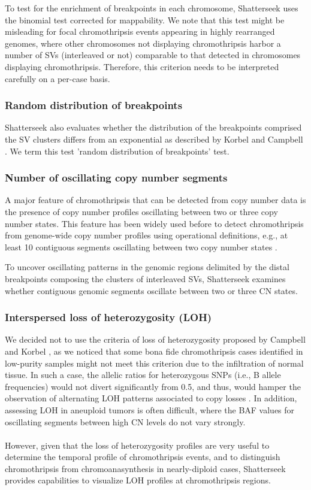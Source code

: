 \documentclass[twoside,a4wide,11pt]{article}\usepackage[]{graphicx}\usepackage[]{color}
\begin{document}
To test for the enrichment of breakpoints in each chromosome,
Shatterseek uses the binomial test corrected for mappability. 
We note that this test might be misleading for focal chromothripsis events
appearing in highly rearranged genomes, where
other chromosomes not displaying chromothripsis harbor a number of SVs (interleaved or not) comparable to that
detected in chromosomes displaying chromothripsis. 
Therefore, this criterion needs to be interpreted carefully on a per-case basis.

\subsubsection{Random distribution of breakpoints}
Shatterseek also evaluates whether the distribution of the breakpoints comprised the SV clusters
differs from an exponential as described by Korbel and Campbell \cite{Korbel2013}.
We term this test 'random distribution of breakpoints' test.

\subsubsection{Number of oscillating copy number segments}
A major feature of chromothripsis that can be detected from copy number data is the 
presence of copy number profiles oscillating between two or three copy number states.
This feature has been widely used before to detect chromothripsis from 
genome-wide copy number profiles using operational definitions,
e.g., at least 10 contiguous segments oscillating between two copy number states \cite{Rausch2012}. 

To uncover oscillating patterns in the genomic regions delimited by the distal breakpoints composing 
the clusters of interleaved SVs,
Shatterseek examines whether contiguous genomic segments oscillate between two or three CN states. 

\subsubsection{Interspersed loss of heterozygosity (LOH)}

We decided not to use the criteria of loss of heterozygosity proposed by Campbell and Korbel \cite{Korbel2013}, 
as we noticed that some bona fide chromothripsis cases identified in low-purity samples might not meet this criterion due to the infiltration of normal tissue.
In such a case, the allelic ratios for heterozygous SNPs (i.e., B allele frequencies) would not divert significantly from 0.5, and thus, would hamper the observation of alternating LOH patterns associated to copy losses \cite{Song2012}.
In addition, assessing LOH in aneuploid tumors is often difficult,
where the BAF values for oscillating segments between high CN levels do not vary strongly.\\
\\
However, given that the loss of heterozygosity profiles are very useful to
determine the temporal profile of chromothripsis events, 
and to distinguish chromothripsis from chromoanasynthesis in nearly-diploid cases,
Shatterseek provides capabilities to visualize LOH profiles at chromothripsis regions.
\\
\end{document}
